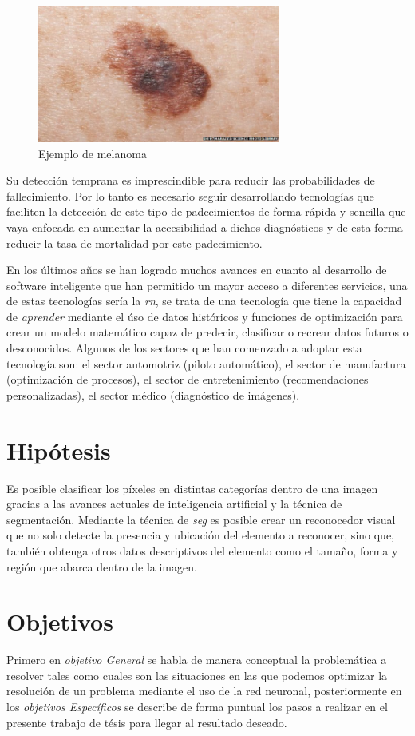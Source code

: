 \begin{figure}[h!]
    \includegraphics[width=80mm, scale = 0.8]{Figuras/skin_cancer_bbc.jpg}
    \centering
    \caption{Ejemplo de melanoma \citep{cancer_img_1}}
    \label{fig:can_jpg}
\end{figure}
 Su detección temprana es imprescindible para reducir las probabilidades de fallecimiento. Por lo tanto es necesario seguir desarrollando tecnologías que faciliten la detección de este tipo de padecimientos de forma rápida y sencilla que vaya enfocada en aumentar la accesibilidad a dichos diagnósticos y de esta forma reducir la tasa de mortalidad por este padecimiento.

En los últimos años se han logrado muchos avances en cuanto al desarrollo de software inteligente que han permitido un mayor acceso a diferentes servicios, una de estas tecnologías sería la \emph{\gls{rn}}, se trata de una tecnología que tiene la capacidad de \emph{aprender} mediante el úso de datos históricos y funciones de optimización para crear un modelo matemático capaz de predecir, clasificar o recrear datos futuros o desconocidos. Algunos de los sectores que han comenzado a adoptar esta tecnología son: el sector automotriz (piloto automático), el sector de manufactura (optimización de procesos), el sector de entretenimiento (recomendaciones personalizadas), el sector médico (diagnóstico de imágenes). 


\section{Hipótesis}
Es posible clasificar los píxeles en distintas categorías dentro de una imagen gracias a las avances actuales de inteligencia artificial y la técnica de segmentación. Mediante la técnica de \emph{\gls{seg}} es posible crear un reconocedor visual que no solo detecte la presencia y ubicación del elemento a reconocer, sino que, también obtenga otros datos descriptivos del elemento como el tamaño, forma y región que abarca dentro de la imagen.

\section{Objetivos}
Primero en \emph{objetivo General} se habla de manera conceptual la problemática a resolver tales como cuales son las situaciones en las que podemos optimizar la resolución de un problema mediante el uso de la red neuronal, posteriormente en los \emph{objetivos Específicos} se describe de forma puntual los pasos a realizar en el presente trabajo de tésis para llegar al resultado deseado.

